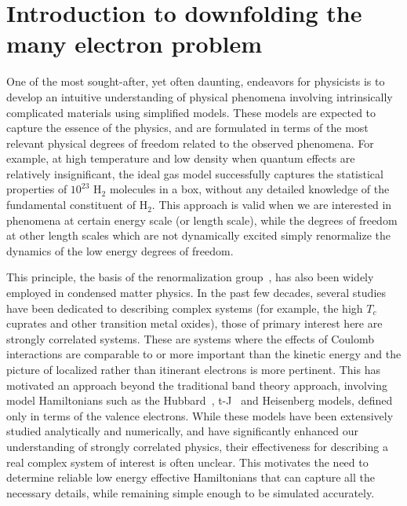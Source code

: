 \section{Introduction to downfolding the many electron problem}

One of the most sought-after, yet often daunting, endeavors for physicists is to develop 
an intuitive understanding of physical phenomena involving intrinsically complicated materials 
using simplified models. These models are expected to capture the essence of the physics, and are formulated in terms 
of the most relevant physical degrees of freedom related to the observed phenomena. 
For example, at high temperature and low density when quantum effects are relatively insignificant, the ideal gas model 
successfully captures the statistical properties of $10^{23}$ H$_{2}$ molecules in a box, 
without any detailed knowledge of the fundamental constituent of H$_{2}$. This approach is valid when we are interested in 
phenomena at certain energy scale (or length scale), while the degrees of freedom at other length scales which are not 
dynamically excited simply renormalize the dynamics of the low energy degrees of freedom. 

This principle, the basis of the renormalization group~\cite{Wilson}, 
has also been widely employed in condensed matter physics. In the past few decades, several studies 
have been dedicated to describing complex systems (for example, the high $T_c$ cuprates and other transition metal oxides), those of 
primary interest here are strongly correlated systems. These are systems where the effects of Coulomb 
interactions are comparable to or more important than the kinetic energy and the picture of 
localized rather than itinerant electrons is more pertinent. This has motivated an approach beyond the 
traditional band theory approach, involving model Hamiltonians such as the Hubbard~\cite{Hubbard}, t-J~\cite{tJSpalek} 
and Heisenberg models, defined only in terms of the valence electrons. 
While these models have been extensively studied analytically and numerically, and have significantly 
enhanced our understanding of strongly correlated physics, their effectiveness 
for describing a real complex system of interest is often unclear. 
This motivates the need to determine reliable low energy effective Hamiltonians that can capture all the necessary details, while 
remaining simple enough to be simulated accurately.  

